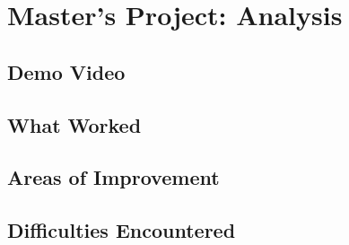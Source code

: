 \section{Master's Project: Analysis}

\subsection{Demo Video}

\subsection{What Worked}

\subsection{Areas of Improvement}

\subsection{Difficulties Encountered}

\newpage